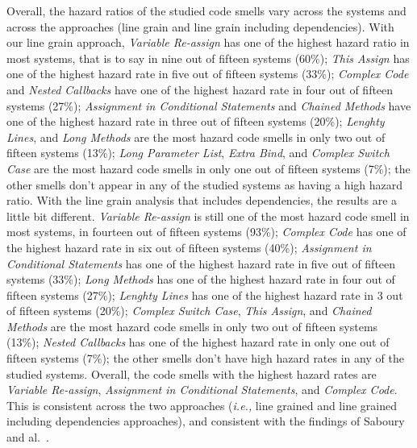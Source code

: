 \documentclass[smallcondensed]{svjour3}
\newcommand{\ie}{{\textit{i.e.,}}}
\begin{document}
Overall, the hazard ratios of the studied code smells vary across the systems and across the approaches (line grain and line grain including dependencies). With our line grain approach, \textsl{Variable Re-assign} has one of the highest hazard ratio in most systems, that is to say in nine out of fifteen systems (60\%); \textsl{This Assign} has one of the highest hazard rate in five out of fifteen systems (33\%); \textsl{Complex Code} and \textsl{Nested Callbacks} have one of the highest hazard rate in four out of fifteen systems (27\%); \textsl{Assignment in Conditional Statements} and \textsl{Chained Methods} have one of the highest hazard rate in three out of fifteen systems (20\%); \textsl{Lenghty Lines}, and \textsl{Long Methods} are the most hazard code smells in only two out of fifteen systems (13\%); \textsl{Long Parameter List}, \textsl{Extra Bind}, and \textsl{Complex Switch Case} are the most hazard code smells in only one out of fifteen systems (7\%); the other smells don't appear in any of the studied systems as having a high hazard ratio. With the line grain analysis that includes dependencies, the results are a little bit different. \textsl{Variable Re-assign} is still one of the most hazard code smell in most systems, in fourteen out of fifteen systems (93\%); \textsl{Complex Code} has one of the highest hazard rate in six out of fifteen systems (40\%);  \textsl{Assignment in Conditional Statements} has one of the highest hazard rate in five out of fifteen systems (33\%); \textsl{Long Methods} has one of the highest hazard rate in four out of fifteen systems (27\%); \textsl{Lenghty Lines} has one of the highest hazard rate in 3 out of fifteen systems (20\%); \textsl{Complex Switch Case}, \textsl{This Assign}, and \textsl{Chained Methods} are the most hazard code smells in only two out of fifteen systems (13\%); \textsl{Nested Callbacks} has one of the highest hazard rate in only one out of fifteen systems (7\%); the other smells don't have high hazard rates in any of the studied systems. Overall, the code smells with the highest hazard rates are \textsl{Variable Re-assign}, \textsl{Assignment in Conditional Statements}, and \textsl{Complex Code}. This is consistent across the two approaches (\ie{} line grained and line grained including dependencies approaches), and consistent with the findings of Saboury and al.~\cite{saboury2017empirical}.
\end{document}
